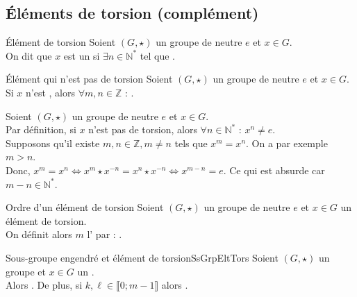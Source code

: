 \documentclass[12pt,a4paper]{report}
\begin{document}
    
    \subsection{Éléments de torsion (complément)}

    \begin{definition}{Élément de torsion}{}
    Soient $(G, \star)$ un groupe de neutre $e$ et $x \in G$.\\
    On dit que $x$ est un  si $\exists n \in \mathbb{N}^*$ tel que .
    \end{definition}
    
    \begin{proposition}{Élément qui n'est pas de torsion}{}
    Soient $(G, \star)$ un groupe de neutre $e$ et $x \in G$.\\
    Si $x$ n'est , alors $\forall m, n \in \mathbb{Z}$ : .
    \end{proposition}
    
    \begin{demo}
    Soient $(G, \star)$ un groupe de neutre $e$ et $x \in G$.\\
    Par définition, si $x$ n'est pas de torsion, alors $\forall n \in \mathbb{N}^*$ : $x^n \neq e$.\\
    Supposons qu'il existe $m, n \in \mathbb{Z}, m \neq n$ tels que $x^m = x^n$. On a par exemple $m > n$.\\
    Donc, $x^m = x^n \Leftrightarrow x^m \star x^{-n} = x^n \star x^{-n} \Leftrightarrow x^{m-n} = e$. Ce qui est absurde car $m-n \in \mathbb{N}^*$.
    \end{demo}
    
    \begin{definition}{Ordre d'un élément de torsion}{}
    Soient $(G, \star)$ un groupe de neutre $e$ et $x \in G$ un élément de torsion.\\
    On définit alors $m$ l' par : . 
    \end{definition}
    
    \begin{proposition}{Sous-groupe engendré et élément de torsion}{SsGrpEltTors}
    Soient $(G, \star)$ un groupe et $x \in G$ un .\\
    Alors . De plus, si $k, \ell \in \llbracket 0 ; m - 1 \rrbracket$ alors .
    \end{proposition}
    
\end{document}
